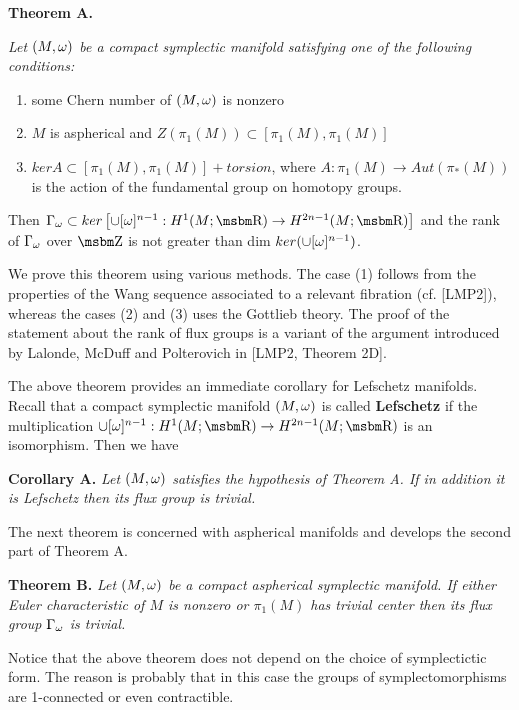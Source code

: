 {\bf Theorem A.}
{\it Let $(M,\omega) $ be a compact symplectic manifold
satisfying one of the following conditions:
   \begin{enumerate}
      \item some Chern number of $(M,\omega) $ is nonzero

      \item $M$ is aspherical and $Z(\pi _1(M))\subset [\pi _1(M),\pi _1 (M)]$

      \item $kerA\subset [\pi _1(M),\pi _1(M)]+torsion$, where 
            $A:\pi _1(M)\to Aut(\pi _*(M))$ is the action of the fundamental
            group on homotopy groups.

   \end{enumerate}
Then 
$\Ga _{\om }\subset ker\n [\cup [\om ]^{n-1}:H^1(M;\B R)\to H^{2n-1}(M;\B R)\r]$
and the rank of $\Gamma _{\omega }$ over $\B Z$ is not greater than 
dim $ker(\cup [\omega ]^{n-1})$.}



\bigskip

We prove this theorem using various methods.
The case (1) follows from the properties of the Wang
sequence associated to a relevant fibration (cf. [LMP2]),
whereas the cases (2) and (3) uses the Gottlieb theory.
The proof of the statement about the rank of flux groups
is a variant of the argument introduced by Lalonde,
McDuff and Polterovich in [LMP2, Theorem 2D].


The above theorem provides an immediate corollary for Lefschetz
manifolds. Recall that a compact symplectic manifold $(M,\omega) $
is called {\bf Lefschetz } if the multiplication
$\cup[\om]^{n-1}:H^1(M;\B R)\to H^{2n-1}(M;\B R)$ is
an isomorphism. Then we have

\bigskip

{\bf Corollary A. } 
{\it Let $(M,\omega) $ satisfies the hypothesis
of Theorem A. If in addition it is Lefschetz then its 
flux group is trivial. } 


\bigskip

The next theorem is concerned with aspherical manifolds and
develops the second part of Theorem A.

\bigskip

{\bf Theorem B. } 
{\it Let $(M,\omega) $ be a compact aspherical
symplectic manifold. If either Euler characteristic
of $M$ is nonzero or $\pi _1(M)$ has trivial center
then its flux group $\Gamma _{\omega }$ is trivial.}


\bigskip

Notice that the above theorem does not depend on the choice
of symplectictic form. The reason is probably that in this
case the groups of symplectomorphisms are 1-connected or
even contractible.






